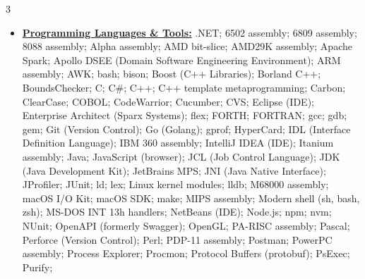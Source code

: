 \documentclass[letterpaper,11pt]{article}
\begin{document}
\begin{multicols}{3}
{\begin{itemize}[leftmargin=0.1in, label={}, itemsep=0pt, parsep=0pt, topsep=0pt, partopsep=0pt]
                \item
                \textbf{\uline{Programming Languages \& Tools:}}  \hspace{0pt}
                .NET;
                6502 assembly;
                6809 assembly;
                8088 assembly;
                Alpha assembly;
                AMD bit-slice;
                AMD29K assembly;
                Apache Spark;
                Apollo DSEE (Domain Software Engineering Environment);
                ARM assembly;
                AWK;
                bash;
                bison;
                Boost (C++ Libraries);
                Borland C++;
                BoundsChecker;
                C;
                C\#;
                C++;
                C++ template metaprogramming;
                Carbon;
                ClearCase;
                COBOL;
                CodeWarrior;
                Cucumber;
                CVS;
                Eclipse (IDE);
                Enterprise Architect (Sparx Systems);
                flex;
                FORTH;
                FORTRAN;
                gcc;
                gdb;
                gem;
                Git (Version Control);
                Go (Golang);
                gprof;
                HyperCard;
                IDL (Interface Definition Language);
                IBM 360 assembly;
                IntelliJ IDEA (IDE);
                Itanium assembly;
                Java;
                JavaScript (browser);
                JCL (Job Control Language);
                JDK (Java Development Kit);
                JetBrains MPS;
                JNI (Java Native Interface);
                JProfiler;
                JUnit;
                ld;
                lex;
                Linux kernel modules;
                lldb;
                M68000 assembly;
                macOS I/O Kit;
                macOS SDK;
                make;
                MIPS assembly;
                Modern shell (sh, bash, zsh);
                MS-DOS INT 13h handlers;
                NetBeans (IDE);
                Node.js;
                npm;
                nvm;
                NUnit;
                OpenAPI (formerly Swagger);
                OpenGL;
                PA-RISC assembly;
                Pascal;
                Perforce (Version Control);
                Perl;
                PDP-11 assembly;
                Postman;
                PowerPC assembly;
                Process Explorer;
                Procmon;
                Protocol Buffers (protobuf);
                PsExec;
                Purify;

\end{itemize}}
\end{multicols}
\end{document}

